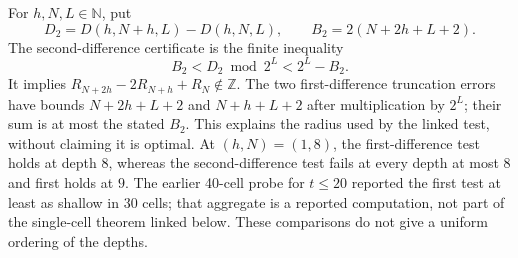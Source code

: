 \begin{obs}\label{prop:B9cert-kill}
For $h,N,L\in\mathbb N$, put
\[
 D_2=D(h,N+h,L)-D(h,N,L),\qquad B_2=2(N+2h+L+2).
\]
The second-difference certificate is the finite inequality
\[
 B_2<D_2\bmod2^L<2^L-B_2.
\]
It implies $R_{N+2h}-2R_{N+h}+R_N\notin\mathbb Z$.
The two first-difference truncation errors have bounds
$N+2h+L+2$ and $N+h+L+2$ after multiplication by $2^L$;
their sum is at most the stated $B_2$. This explains the radius
used by the linked test, without claiming it is optimal.
At $(h,N)=(1,8)$, the first-difference test holds at depth $8$,
whereas the second-difference test fails at every depth at most $8$
and first holds at $9$. The earlier 40-cell probe for $t\le20$
reported the first test at least as shallow in 30 cells; that aggregate
is a reported computation, not part of the single-cell theorem linked
below. These comparisons do not give a uniform ordering of the depths.
\end{obs}

